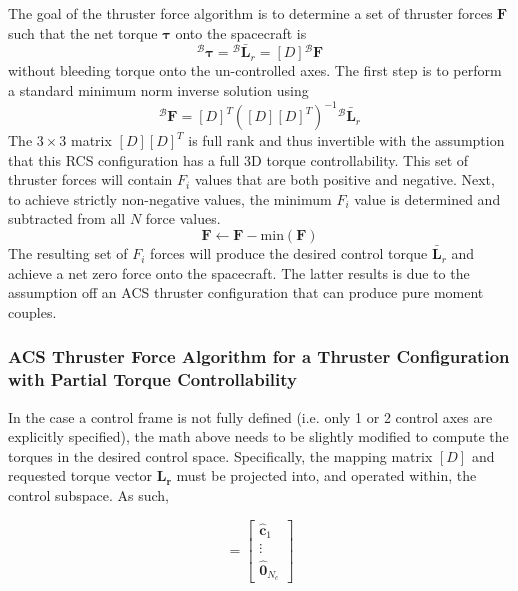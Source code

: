 The goal of the thruster force algorithm is to determine a set of thruster forces $\bm F$ such that the net torque $\bm \tau$ onto the spacecraft is
\begin{equation}
	\label{eq:th:2}
	{}^{\mathcal{B}}\bm\tau = {}^{\mathcal{B}}\bar{\bm L}_{r}  = [D]{}^{\mathcal{B}}\bm F
\end{equation}
without bleeding torque onto the un-controlled axes.  The first step is to perform a standard minimum norm inverse solution using
\begin{equation}
	\label{eq:th:min}
	{}^{\mathcal{B}}\bm F = [D]^{T}([D][D]^{T})^{-1} {}^{\mathcal{B}}\bar{\bm L}_{r}
\end{equation}
The $3\times 3$ matrix $[D][D]^{T}$ is full rank and thus invertible with the assumption that this RCS configuration has a full 3D torque controllability.  This set of  thruster forces will contain $F_{i}$ values that are both positive and negative.  Next, to achieve strictly non-negative values, the minimum $F_{i}$ value is determined and subtracted from all $N$ force values.  
\begin{equation}
	\bm F \leftarrow \bm F -  \text{min}(\bm F)
\end{equation}
The resulting set of $F_{i}$ forces will produce the desired control torque $\bar{\bm L}_{r}$ and achieve a net zero force onto the spacecraft.  The latter results is due to the assumption off an ACS thruster configuration that can produce pure moment couples.  

\subsubsection{ACS Thruster Force Algorithm for a Thruster Configuration with Partial Torque Controllability}

In the case a control frame is not fully defined (i.e. only 1 or 2 control axes are explicitly specified), the math above needs to be slightly modified to compute the torques in the desired control space. Specifically, the mapping matrix $[D]$ and requested torque vector $\mathbf{L_r}$ must be projected into, and operated within, the control subspace. As such,

\begin{equation}
	[C]  = \begin{bmatrix}
		\hat{\bm c}_{1} \\ \vdots \\ \hat{\bm 0}_{N_{c}}
	\end{bmatrix}
\end{equation}

